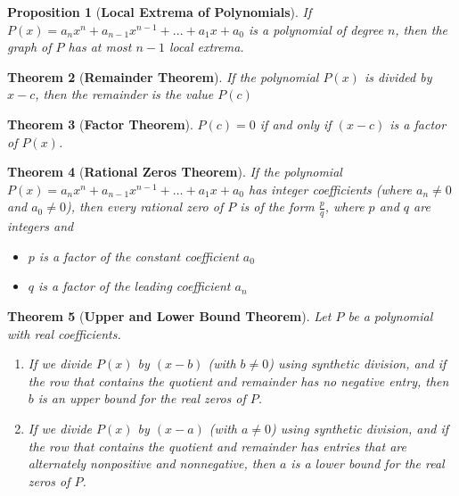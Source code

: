 \documentclass{article}
\theoremstyle{plain}
\newtheorem{theorem}{Theorem}[section]
\newtheorem{proposition}[theorem]{Proposition}
\begin{document}
\begin{proposition}[\textbf{Local Extrema of Polynomials}]
    If $P(x)=a_nx^n+a_{n-1}x^{n-1}+...+a_1x+a_0$
    is a polynomial of degree $n$, then the graph of $P$ has at most $n-1$ local extrema.
    \cite{stewart2015precalculus}
\end{proposition}

\begin{theorem}[\textbf{Remainder Theorem}]
    If the polynomial $P(x)$ is divided by $x-c$, then the remainder is the value $P(c)$
    \cite{stewart2015precalculus}
\end{theorem}

\begin{theorem}[\textbf{Factor Theorem}]
    \( P(c) = 0 \) if and only if \( (x - c) \) is a factor of \( P(x) \).
    \cite{stewart2015precalculus}
\end{theorem}

\begin{theorem}[\textbf{Rational Zeros Theorem}]
    If the polynomial $P(x) = a_n x^n + a_{n-1} x^{n-1} + \ldots + a_1 x + a_0$ has integer coefficients (where $a_n \neq 0$ and $a_0 \neq 0$), then every rational zero of $P$ is of the form $\frac{p}{q}$, where $p$ and $q$ are integers and
    \begin{itemize}
        \item $p$ is a factor of the constant coefficient $a_0$
        \item $q$ is a factor of the leading coefficient $a_n$
    \end{itemize}
    \cite{stewart2015precalculus}
\end{theorem}

\begin{theorem}[\textbf{Upper and Lower Bound Theorem}]
    Let $P$ be a polynomial with real coefficients.
    \begin{enumerate}
        \item If we divide $P(x)$ by $(x - b)$ (with $b \neq 0$) using synthetic division, and if the row that contains the quotient and remainder has no negative entry, then $b$ is an upper bound for the real zeros of $P$.
        \item If we divide $P(x)$ by $(x - a)$ (with $a \neq 0$) using synthetic division, and if the row that contains the quotient and remainder has entries that are alternately nonpositive and nonnegative, then $a$ is a lower bound for the real zeros of $P$.
    \end{enumerate}
    \cite{stewart2015precalculus}
\end{theorem}





\nocite{*}


\end{document}
